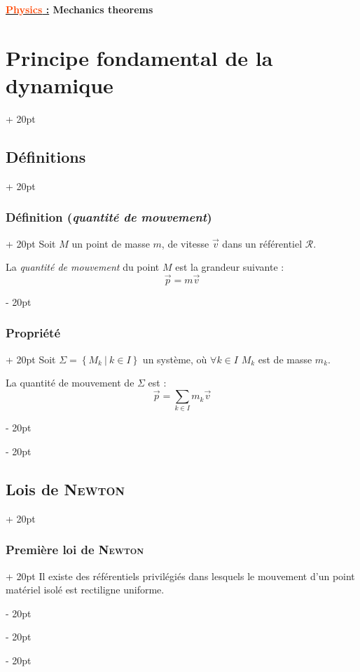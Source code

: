 \documentclass[a4paper, 12pt, twoside]{article}
\renewcommand{\emph}{\textcolor{ff4500}}
\newcommand{\set}[1]{\left\{ #1 \right\}}
\newcommand{\ind}[1][20pt]{\advance\leftskip + #1}
\newcommand{\deind}[1][20pt]{\advance\leftskip - #1}
\newenvironment{indt}[2][20pt]{#2 \par \ind[#1]}{\par \deind} %
\newcommand{\thetitle}[2]{\begin{center}\textbf{{\LARGE \underline{\emph{#1} :}} {\Large #2}}\end{center}}
\begin{document}
    
    \thetitle{Physics}{Mechanics theorems}
    
    \tableofcontents
    \newpage
    
    \begin{indt}{\section{Principe fondamental de la dynamique}}
        \begin{indt}{\subsection{Définitions}}
            \begin{indt}{\subsubsection{Définition (\textit{quantité de mouvement})}}
                Soit $M$ un point de masse $m$, de vitesse $\vec v$ dans un référentiel $\mathscr R$.

                La \textit{quantité de mouvement} du point $M$ est la grandeur suivante :
                \[
                    \vec p = m \vec v
                \]
            \end{indt}

            \vspace{12pt}
            
            \begin{indt}{\subsubsection{Propriété}}
                Soit $\Sigma = \set{M_k\ |\ k \in I}$ un système, où $\forall k \in I$ $M_k$ est de masse $m_k$.

                La quantité de mouvement de $\Sigma$ est :
                \[
                    \vec p = \sum_{k \in I} m_k \vec v
                \]
            \end{indt}
        \end{indt}

        \vspace{12pt}
        
        \begin{indt}{\subsection{Lois de \textsc{Newton}}}
            \begin{indt}{\subsubsection{Première loi de \textsc{Newton}}}
                Il existe des référentiels privilégiés dans lesquels le mouvement d'un point matériel isolé est rectiligne uniforme.


\end{indt}
\end{indt}
\end{indt}
\end{document}
